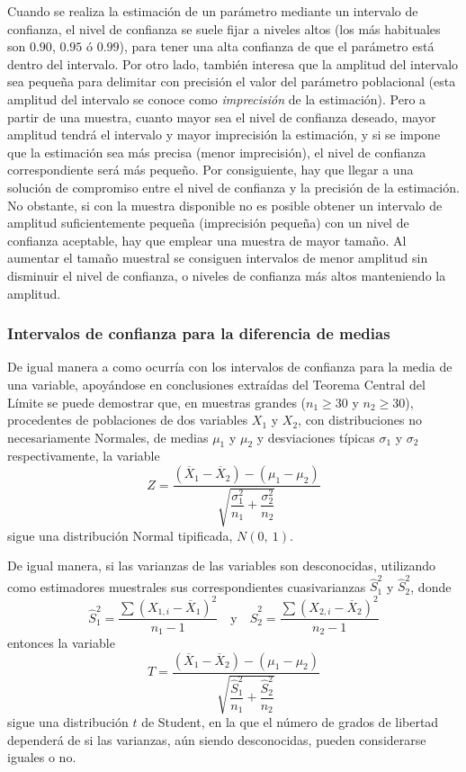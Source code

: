 Cuando se realiza la estimación de un parámetro mediante un intervalo de confianza, el nivel de confianza se suele fijar
a niveles altos (los más habituales son $0.90$, $0.95$ ó $0.99$), para tener una alta confianza de que el parámetro está
dentro del intervalo. Por otro lado, también interesa que la amplitud del intervalo sea pequeña para delimitar con
precisión el valor del parámetro poblacional (esta amplitud del intervalo se conoce como \emph{imprecisión} de la
estimación). Pero a partir de una muestra, cuanto mayor sea el nivel de confianza deseado, mayor amplitud tendrá el
intervalo y mayor imprecisión la estimación, y si se impone que la estimación sea más precisa (menor imprecisión), el
nivel de confianza correspondiente será más pequeño. Por consiguiente, hay que llegar a una solución de compromiso entre
el nivel de confianza y la precisión de la estimación. No obstante, si con la muestra disponible no es posible obtener un
intervalo de amplitud suficientemente pequeña (imprecisión pequeña) con un nivel de confianza aceptable, hay que emplear
una muestra de mayor tamaño. Al aumentar el tamaño muestral se consiguen intervalos de menor amplitud sin disminuir el
nivel de confianza, o niveles de confianza más altos manteniendo la amplitud.


\subsubsection{Intervalos de confianza para la diferencia de medias}
De igual manera a como ocurría con los intervalos de confianza para la media de una variable, apoyándose en conclusiones
extraídas del Teorema Central del Límite se puede demostrar que, en muestras grandes ($n_1\geq30$ y $n_2\geq30$),
procedentes de poblaciones de dos variables $X_1$ y $X_2$, con distribuciones no necesariamente Normales, de medias $\mu
_{1}$ y $\mu _{2}$ y desviaciones típicas $\sigma_{1}$ y $\sigma_{2}$ respectivamente, la variable \[Z= \dfrac{\left(
\overline{X}_{1}-\overline{X}_{2}\right) -(\mu _{1}-\mu _{2})}{\sqrt{\dfrac{\sigma _{1}^{2}}{n_{1}}+\dfrac{\sigma
_{2}^{2}}{n_{2}}}} \] sigue una distribución Normal tipificada, $N(0,\ 1)$.

De igual manera, si las varianzas de las variables son desconocidas, utilizando como estimadores muestrales sus
correspondientes cuasivarianzas $\hat S^2_{1}$ y $\hat S^2_{2}$, donde 
\[
\hat S_{1}^{2}= \dfrac{\sum \left( X_{1,i}-\overline{X}_{1}\right) ^{2}}{n_{1}-1}
\quad \text{y} \quad \hat S_{2}^{2}= \dfrac{\sum \left( X_{2,i}-\overline{X}_{2}\right) ^{2}}{n_{2}-1}
\]
entonces la variable 
\[
T= \dfrac{\left( \overline{X}_{1}-\overline{X}_{2}\right) -(\mu
_{1}-\mu_{2})}{\sqrt{\dfrac{\hat S_{1}^{2}}{n_{1}}+\dfrac{\hat S_{2}^{2}}{n_{2}}}}
\]
sigue una distribución $t$ de Student, en la que el número de grados de libertad dependerá de si las varianzas, aún
siendo desconocidas, pueden considerarse iguales o no.

